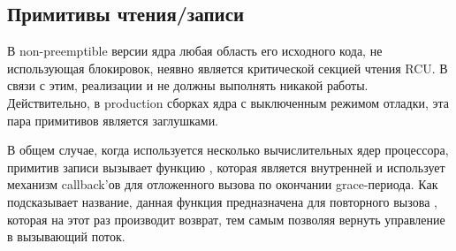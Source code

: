 \subsection{Примитивы чтения/записи} \label{sec:api_impl}
В non-preemptible версии ядра любая область его исходного кода,
не использующая блокировок, неявно является критической секцией чтения RCU.
В связи с этим, реализации  и 
не должны выполнять никакой работы. Действительно, в production сборках ядра
с выключенным режимом отладки, эта пара примитивов является
заглушками.

В общем случае, когда используется несколько вычислительных ядер процессора,
примитив записи  вызывает функцию ,
которая является внутренней и использует механизм callback'ов
для отложенного вызова  по окончании grace-периода.
Как подсказывает название, данная функция предназначена для повторного вызова
, которая на этот раз производит возврат,
тем самым позволяя  вернуть управление в вызывающий поток.
